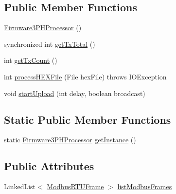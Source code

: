 \subsection*{Public Member Functions}
\begin{DoxyCompactItemize}
\item 
\hyperlink{classcom_1_1eneri_1_1scorpio__metertool_1_1firmware_1_1_firmware3_p_h_processor_a4b5059b379bcbaadce94780f9f3162a8}{Firmware3\+P\+H\+Processor} ()
\item 
synchronized int \hyperlink{classcom_1_1eneri_1_1scorpio__metertool_1_1firmware_1_1_firmware3_p_h_processor_afff9fde9c6ba8e6db1888b10ea042d47}{get\+Tx\+Total} ()
\item 
int \hyperlink{classcom_1_1eneri_1_1scorpio__metertool_1_1firmware_1_1_firmware3_p_h_processor_a5d652294a2074f434facfa3f932e3b9c}{get\+Tx\+Count} ()
\item 
int \hyperlink{classcom_1_1eneri_1_1scorpio__metertool_1_1firmware_1_1_firmware3_p_h_processor_a3ce58512c714d310a88f33a068fc95d5}{process\+H\+E\+X\+File} (File hex\+File)  throws I\+O\+Exception   
\item 
void \hyperlink{classcom_1_1eneri_1_1scorpio__metertool_1_1firmware_1_1_firmware3_p_h_processor_a21b4b12b178b732f54996229895988ce}{start\+Upload} (int delay, boolean broadcast)
\end{DoxyCompactItemize}
\subsection*{Static Public Member Functions}
\begin{DoxyCompactItemize}
\item 
static \hyperlink{classcom_1_1eneri_1_1scorpio__metertool_1_1firmware_1_1_firmware3_p_h_processor}{Firmware3\+P\+H\+Processor} \hyperlink{classcom_1_1eneri_1_1scorpio__metertool_1_1firmware_1_1_firmware3_p_h_processor_af3c6dd9f2d5b60bc48021da1ea7f0f6f}{get\+Instance} ()
\end{DoxyCompactItemize}
\subsection*{Public Attributes}
\begin{DoxyCompactItemize}
\item 
Linked\+List$<$ \hyperlink{classcom_1_1eneri_1_1scorpio__metertool_1_1firmware_1_1_modbus_r_t_u_frame}{Modbus\+R\+T\+U\+Frame} $>$ \hyperlink{classcom_1_1eneri_1_1scorpio__metertool_1_1firmware_1_1_firmware3_p_h_processor_a191f47a4072968c0ed06cfee6d4041b3}{list\+Modbus\+Frames}
\end{DoxyCompactItemize}
